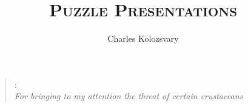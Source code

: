\documentclass{book}
\begin{document}
\title{{\centering\Huge\textsc{Puzzle Presentations}}}
\author{\Large Charles Kolozsvary}
\date{}

\maketitle

\begin{quote}
{: \\ 
\hfill {\sl For bringing to my attention the threat of certain crustaceans}}
\end{quote}
\end{document}
